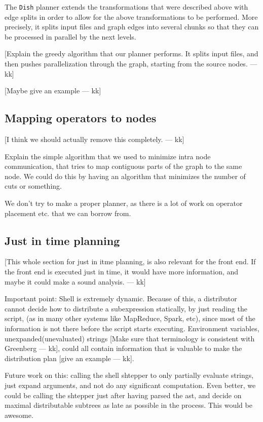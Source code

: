 \documentclass[sigplan,10pt,review,anonymous]{acmart}
\newcommand{\kk}[1]{[{\color{magenta}#1 --- kk}]}
\begin{document}
The \texttt{Dish} planner extends the transformations that were
described above with edge splits in order to allow for the above
transformations to be performed. More precisely, it splits input files
and graph edges into several chunks so that they can be processed in
parallel by the next levels.

\kk{Explain the greedy algorithm that our planner performs. It splits
  input files, and then pushes parallelization through the graph,
  starting from the source nodes.}

\kk{Maybe give an example}



\subsection{Mapping operators to nodes}

\kk{I think we should actually remove this completely.}

Explain the simple algorithm that we used to minimize intra node
communication, that tries to map contiguous parts of the graph to the
same node. We could do this by having an algorithm that minimizes the
number of cuts or something.

We don't try to make a proper planner, as there is a lot of work on
operator placement etc. that we can borrow from.


\subsection{Just in time planning}

\kk{This whole section for just in itme planning, is also relevant for
  the front end. If the front end is executed just in time, it would
  have more information, and maybe it could make a sound analysis.}

Important point: Shell is extremely dynamic. Because of this, a
distributor cannot decide how to distribute a subexpression
statically, by just reading the script, (as in many other systems like
MapReduce, Spark, etc), since most of the information is not there
before the script starts executing. Environment variables,
unexpanded(unevaluated) strings \kk{Make sure that terminology is
  consistent with Greenberg}, could all contain information that is
valuable to make the distribution plan \kk{give an example}.


Future work on this: calling the shell shtepper to only partially
evaluate strings, just expand arguments, and not do any significant
computation. Even better, we could be calling the shtepper just after
having parsed the ast, and decide on maximal distributable subtrees as
late as possible in the process. This would be awesome.
\end{document}
